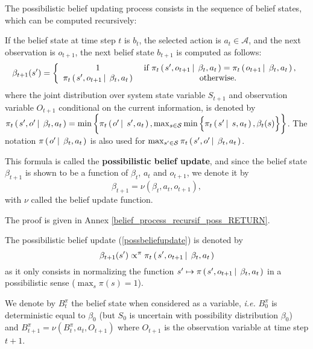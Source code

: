 The possibilistic belief updating process consists in the sequence of belief states,
which can be computed recursively: 
\begin{theorem}
\label{belief_process_recursif_poss}
If the belief state at time step $t$ is $b_t$,
the selected action is $a_t \in \mathcal{A}$,
and the next observation is $o_{t+1}$, 
the next belief state $b_{t+1}$ is computed as follows:
\begin{equation}
\label{possbeliefupdate}
\beta_{t+1}(s') = \left \{ \begin{array}{ccc}
1 & \mbox{ if } \pi_t \left( \left.  s', o_{t+1} \, \right| \left. \, \beta_t, a_t \right. \right)= \pi_t \left( \left.  o_{t+1} \, \right| \left. \, \beta_t,a_t  \right. \right), \\
\pi_t \left( \left.  s', o_{t+1} \, \right| \left. \, \beta_t, a_t \right. \right) & \mbox{ otherwise. } 
\end{array} \right.
\end{equation}
where the joint distribution over system state variable $S_{t+1}$
and observation variable $O_{t+1}$ conditional on the current information, 
is denoted by $\pi_t \left( \left.  s', o' \, \right| \left. \, \beta_t, a_t \right. \right) 
= \min \bigg\{ \pi_{t} \left( \left. o' \, \right| \left. \, s', a_t \right. \right),  \max_{s \in \mathcal{S}} \min \Big\{ \pi_t \left( \left.  s' \, \right| \left. \, s, a_t  \right. \right), \beta_t(s) \Big\} \bigg\}$. 
The notation $\pi \left( \left.  o' \, \right| \left. \, \beta_t, a_t \right. \right)$ is also used for $\max_{s' \in \mathcal{S}} \pi_t \left( \left.  s', o' \, \right| \left. \, \beta_t, a_t \right. \right)$. 

This formula is called the \textbf{possibilistic belief update},
and since the belief state $\beta_{t+1}$ is shown to be a function of $\beta_t$, $a_t$ and $o_{t+1}$,
we denote it by \[ \beta_{t+1} = \nu(\beta_t,a_t,o_{t+1}),\]
with $\nu$ called the belief update function.
\end{theorem}
The proof is given in Annex \ref{belief_process_recursif_poss_RETURN}.

The possibilistic belief update (\ref{possbeliefupdate}) is denoted by
\[ \beta_{t+1}(s') \propto^{\pi} \pi_t \left( \left.  s', o_{t+1} \, \right| \left. \, \beta_t, a_t \right. \right) \]
as it only consists in normalizing the function 
$s' \mapsto \pi \left( \left.  s',o_{t+1} \, \right| \left. \, \beta_t,a_t  \right. \right)$
in a possibilistic sense ($\max_{s} \pi(s) = 1$).

We denote by $B^{\pi}_t$ the belief state when considered as a variable,
\textit{i.e.} $B^{\pi}_0$ is deterministic equal to $\beta_0$
(but $S_0$ is uncertain with possibility distribution $\beta_0$)
and $B^{\pi}_{t+1} = \nu(B^{\pi}_t,a_t,O_{t+1})$
where $O_{t+1}$ is the observation variable at time step $t+1$.

